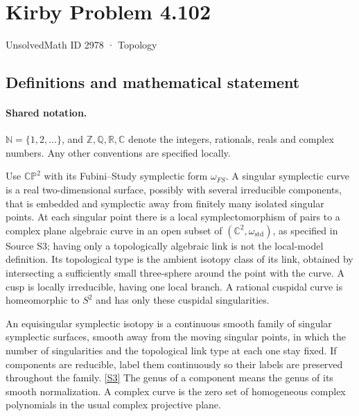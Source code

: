 \documentclass[11pt]{article}
\newcommand{\sref}[2]{\hyperlink{source:#1:#2}{[S#2]}}
\begin{document}
\setcounter{section}{2977}
\section{Kirby Problem 4.102}\label{2978}
{\small\sffamily UnsolvedMath ID 2978 · Topology}
\subsection{Definitions and mathematical statement}

\paragraph{Shared notation.}$\mathbb N=\{1,2,\ldots\}$, and $\mathbb Z,\mathbb Q,\mathbb R,\mathbb C$ denote the integers, rationals, reals and complex numbers. Any other conventions are specified locally.


Use $\mathbb{CP}^2$ with its Fubini--Study symplectic form $\omega_{FS}$. A singular symplectic curve is a real two-dimensional surface, possibly with several irreducible components, that is embedded and symplectic away from finitely many isolated singular points. At each singular point there is a local symplectomorphism of pairs to a complex plane algebraic curve in an open subset of $(\mathbb C^2,\omega_{\mathrm{std}})$, as specified in Source S3; having only a topologically algebraic link is not the local-model definition. Its topological type is the ambient isotopy class of its link, obtained by intersecting a sufficiently small three-sphere around the point with the curve. A cusp is locally irreducible, having one local branch. A rational cuspidal curve is homeomorphic to $S^2$ and has only these cuspidal singularities.

An equisingular symplectic isotopy is a continuous smooth family of singular symplectic surfaces, smooth away from the moving singular points, in which the number of singularities and the topological link type at each one stay fixed. If components are reducible, label them continuously so their labels are preserved throughout the family. \sref{2978}{3} The genus of a component means the genus of its smooth normalization. A complex curve is the zero set of homogeneous complex polynomials in the usual complex projective plane.
\end{document}
